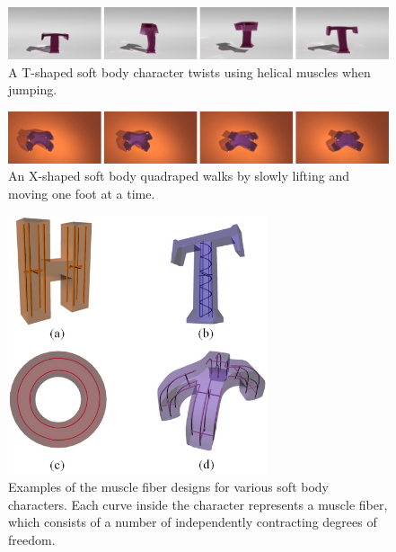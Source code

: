 \begin{figure}[t]
\centering
\includegraphics[width=\textwidth]{figures/TTwist.eps}
\caption{A T-shaped soft body character twists using helical muscles when jumping.}
\label{fig:TJump}
\end{figure}

\begin{figure}[t]
\centering
\includegraphics[width=\textwidth]{figures/XWalk.eps}
\caption{An X-shaped soft body quadraped walks by slowly lifting and moving one foot at a time.}
\label{fig:XWalk}
\end{figure}


\begin{figure}[!b]
\centering
\includegraphics[width=3in]{figures/muscles2.eps}
\caption{Examples of the muscle fiber designs for various soft body characters. Each curve inside the character represents a muscle fiber, which consists of a number of independently contracting degrees of freedom.}
\label{fig:muscles}
\end{figure}


